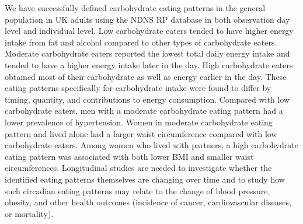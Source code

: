 We have successfully defined carbohydrate eating patterns in the general population in UK adults using the NDNS RP database in both observation day level and individual level. Low carbohydrate eaters tended to have higher energy intake from fat and alcohol compared to other types of carbohydrate eaters. Moderate carbohydrate eaters reported the lowest total daily energy intake and tended to have a higher energy intake later in the day. High carbohydrate eaters obtained most of their carbohydrate as well as energy earlier in the day. These eating patterns specifically for carbohydrate intake were found to differ by timing, quantity, and contributions to energy consumption. Compared with low carbohydrate eaters, men with a moderate carbohydrate eating pattern had a lower prevalence of hypertension. Women in moderate carbohydrate eating pattern and lived alone had a larger waist circumference compared with low carbohydrate eaters. Among women who lived with partners, a high carbohydrate eating pattern was associated with both lower BMI and smaller waist circumferences. Longitudinal studies are needed to investigate whether the identified eating patterns themselves are changing over time and to study how such circadian eating patterns may relate to the change of blood pressure, obesity, and other health outcomes (incidence of cancer, cardiovascular diseases, or mortality).